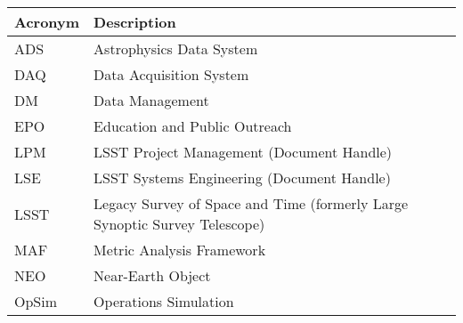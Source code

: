 \addtocounter{table}{-1}
\begin{longtable}{p{}p{}}\hline
\textbf{Acronym} & \textbf{Description}  \\\hline

ADS & Astrophysics Data System \\\hline
DAQ & Data Acquisition System \\\hline
DM & Data Management \\\hline
EPO & Education and Public Outreach \\\hline
LPM & LSST Project Management (Document Handle) \\\hline
LSE & LSST Systems Engineering (Document Handle) \\\hline
LSST & Legacy Survey of Space and Time (formerly Large Synoptic Survey Telescope) \\\hline
MAF & Metric Analysis Framework \\\hline
NEO & Near-Earth Object \\\hline
OpSim & Operations Simulation \\\hline
\end{longtable}
